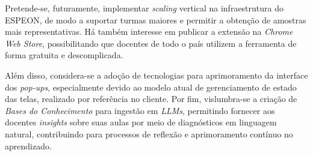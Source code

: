 Pretende-se, futuramente, implementar \textit{scaling} vertical na infraestrutura do ESPEON, de modo a suportar turmas maiores e permitir a obtenção de amostras mais representativas. Há também interesse em publicar a extensão na \textit{Chrome Web Store}, possibilitando que docentes de todo o país utilizem a ferramenta de forma gratuita e descomplicada.

Além disso, considera-se a adoção de tecnologias para aprimoramento da interface dos \textit{pop-ups}, especialmente devido ao modelo atual de gerenciamento de estado das telas, realizado por referência no cliente. Por fim, vislumbra-se a criação de \textit{Bases do Conhecimento} para ingestão em \textit{LLMs}, permitindo fornecer aos docentes \textit{insights} sobre suas aulas por meio de diagnósticos em linguagem natural, contribuindo para processos de reflexão e aprimoramento contínuo no aprendizado.